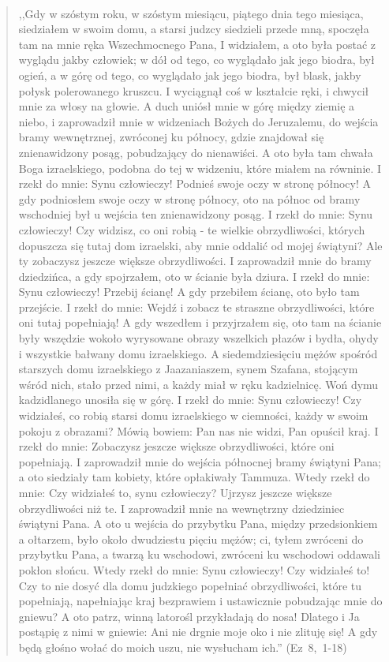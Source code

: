 \documentclass[10pt,a4paper,oneside]{article}
\begin{document}
\paragraph{}
\begin{quote}
,,Gdy w szóstym roku, w szóstym miesiącu, piątego dnia tego miesiąca, siedziałem w swoim domu, a starsi judzcy siedzieli przede mną, spoczęła tam na mnie ręka Wszechmocnego Pana, I widziałem, a oto była postać z wyglądu jakby człowiek; w dół od tego, co wyglądało jak jego biodra, był ogień, a w górę od tego, co wyglądało jak jego biodra, był blask, jakby połysk polerowanego kruszcu. I wyciągnął coś w kształcie ręki, i chwycił mnie za włosy na głowie. A duch uniósł mnie w górę między ziemię a niebo, i zaprowadził mnie w widzeniach Bożych do Jeruzalemu, do wejścia bramy wewnętrznej, zwróconej ku północy, gdzie znajdował się znienawidzony posąg, pobudzający do nienawiści. A oto była tam chwała Boga izraelskiego, podobna do tej w widzeniu, które miałem na równinie. I rzekł do mnie: Synu człowieczy! Podnieś swoje oczy w stronę północy! A gdy podniosłem swoje oczy w stronę północy, oto na północ od bramy wschodniej był u wejścia ten znienawidzony posąg. I rzekł do mnie: Synu człowieczy! Czy widzisz, co oni robią - te wielkie obrzydliwości, których dopuszcza się tutaj dom izraelski, aby mnie oddalić od mojej świątyni? Ale ty zobaczysz jeszcze większe obrzydliwości. I zaprowadził mnie do bramy dziedzińca, a gdy spojrzałem, oto w ścianie była dziura. I rzekł do mnie: Synu człowieczy! Przebij ścianę! A gdy przebiłem ścianę, oto było tam przejście. I rzekł do mnie: Wejdź i zobacz te straszne obrzydliwości, które oni tutaj popełniają! A gdy wszedłem i przyjrzałem się, oto tam na ścianie były wszędzie wokoło wyrysowane obrazy wszelkich płazów i bydła, ohydy i wszystkie bałwany domu izraelskiego. A siedemdziesięciu mężów spośród starszych domu izraelskiego z Jaazaniaszem, synem Szafana, stojącym wśród nich, stało przed nimi, a każdy miał w ręku kadzielnicę. Woń dymu kadzidlanego unosiła się w górę. I rzekł do mnie: Synu człowieczy! Czy widziałeś, co robią starsi domu izraelskiego w ciemności, każdy w swoim pokoju z obrazami? Mówią bowiem: Pan nas nie widzi, Pan opuścił kraj. I rzekł do mnie: Zobaczysz jeszcze większe obrzydliwości, które oni popełniają. I zaprowadził mnie do wejścia północnej bramy świątyni Pana; a oto siedziały tam kobiety, które opłakiwały Tammuza. Wtedy rzekł do mnie: Czy widziałeś to, synu człowieczy? Ujrzysz jeszcze większe obrzydliwości niż te. I zaprowadził mnie na wewnętrzny dziedziniec świątyni Pana. A oto u wejścia do przybytku Pana, między przedsionkiem a ołtarzem, było około dwudziestu pięciu mężów; ci, tyłem zwróceni do przybytku Pana, a twarzą ku wschodowi, zwróceni ku wschodowi oddawali pokłon słońcu. Wtedy rzekł do mnie: Synu człowieczy! Czy widziałeś to! Czy to nie dosyć dla domu judzkiego popełniać obrzydliwości, które tu popełniają, napełniając kraj bezprawiem i ustawicznie pobudzając mnie do gniewu? A oto patrz, winną latorośl przykładają do nosa! Dlatego i Ja postąpię z nimi w gniewie: Ani nie drgnie moje oko i nie zlituję się! A gdy będą głośno wołać do moich uszu, nie wysłucham ich.'' \mbox{(Ez 8, 1-18)}
\end{quote}
\end{document}
